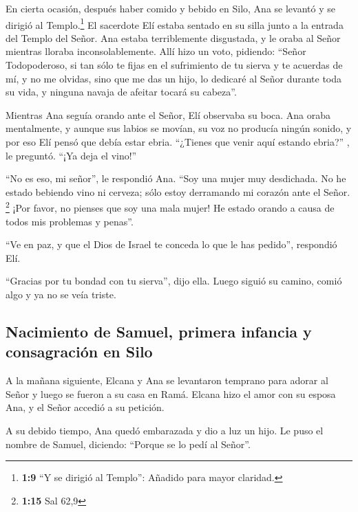  En cierta ocasión, después haber comido y bebido en Silo,
Ana se levantó y se dirigió al Templo.\footnote{\textbf{1:9} ``Y se
  dirigió al Templo'': Añadido para mayor claridad.} El sacerdote Elí
estaba sentado en su silla junto a la entrada del Templo del Señor.
 Ana estaba terriblemente disgustada, y le oraba al Señor
mientras lloraba inconsolablemente.  Allí hizo un voto,
pidiendo: ``Señor Todopoderoso, si tan sólo te fijas en el sufrimiento
de tu sierva y te acuerdas de mí, y no me olvidas, sino que me das un
hijo, lo dedicaré al Señor durante toda su vida, y ninguna navaja de
afeitar tocará su cabeza''.

 Mientras Ana seguía orando ante el Señor, Elí observaba
su boca.  Ana oraba mentalmente, y aunque sus labios se
movían, su voz no producía ningún sonido, y por eso Elí pensó que debía
estar ebria.  ``¿Tienes que venir aquí estando ebria?'' ,
le preguntó. ``¡Ya deja el vino!''

 ``No es eso, mi señor'', le respondió Ana. ``Soy una
mujer muy desdichada. No he estado bebiendo vino ni cerveza; sólo estoy
derramando mi corazón ante el Señor. \footnote{\textbf{1:15} Sal 62,9}
 ¡Por favor, no pienses que soy una mala mujer! He estado
orando a causa de todos mis problemas y penas''.

 ``Ve en paz, y que el Dios de Israel te conceda lo que
le has pedido'', respondió Elí.

 ``Gracias por tu bondad con tu sierva'', dijo ella.
Luego siguió su camino, comió algo y ya no se veía triste.

\hypertarget{nacimiento-de-samuel-primera-infancia-y-consagraciuxf3n-en-silo}{%
\subsection{Nacimiento de Samuel, primera infancia y consagración en
Silo}\label{nacimiento-de-samuel-primera-infancia-y-consagraciuxf3n-en-silo}}

 A la mañana siguiente, Elcana y Ana se levantaron
temprano para adorar al Señor y luego se fueron a su casa en Ramá.
Elcana hizo el amor con su esposa Ana, y el Señor accedió a su petición.

 A su debido tiempo, Ana quedó embarazada y dio a luz un
hijo. Le puso el nombre de Samuel, diciendo: ``Porque se lo pedí al
Señor''.

